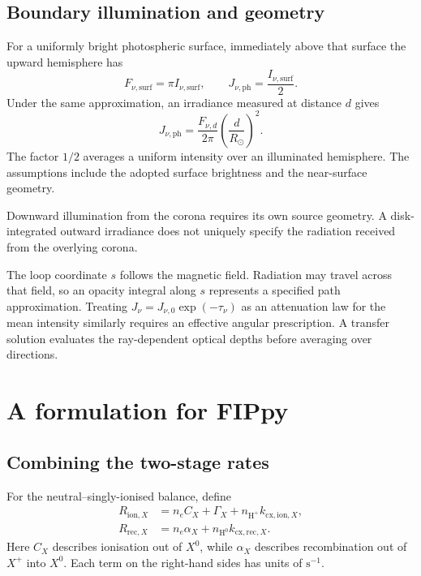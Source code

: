 \documentclass[a4paper,10pt,twoside,openany]{book}
\newcommand{\ChapColor}{Cap1Blue}
\newcommand{\ChapColorLight}{LightBlue}
\newcommand{\setChapColor}[2]{%
  \renewcommand{\ChapColor}{#1}%
  \renewcommand{\ChapColorLight}{#2}}
\numberwithin{equation}{chapter}
\begin{document}
\section{Boundary illumination and geometry}
For a uniformly bright photospheric surface, immediately above
that surface the upward hemisphere has
\begin{equation}
  F_{\nu,\mathrm{surf}}=\pi I_{\nu,\mathrm{surf}},
  \qquad J_{\nu,\mathrm{ph}}=\frac{I_{\nu,\mathrm{surf}}}{2}.
\end{equation}
Under the same approximation, an irradiance measured at distance
$d$ gives
\begin{equation}
  J_{\nu,\mathrm{ph}}
  =\frac{F_{\nu,d}}{2\pi}
   \left(\frac{d}{R_\odot}\right)^2.
\end{equation}
The factor $1/2$ averages a uniform intensity over an illuminated
hemisphere. The assumptions include the adopted surface brightness
and the near-surface geometry.

Downward illumination from the corona requires its own source
geometry. A disk-integrated outward irradiance does not uniquely
specify the radiation received from the overlying corona.

The loop coordinate $s$ follows the magnetic field. Radiation may
travel across that field, so an opacity integral along $s$ represents
a specified path approximation. Treating
$J_\nu=J_{\nu,0}\exp(-\tau_\nu)$ as an attenuation law for the mean
intensity similarly requires an effective angular prescription.
A transfer solution evaluates the ray-dependent optical depths
before averaging over directions.

\setChapColor{Cap4Purple}{LightPurple}
\chapter{A formulation for FIPpy}

\section{Combining the two-stage rates}
For the neutral--singly-ionised balance, define
\begin{align}
  R_{\mathrm{ion},X}
    &=n_eC_X+\Gamma_X
      +n_{\mathrm{H}^+}k_{\mathrm{cx,ion},X},
      \label{eq:total_ion}\\
  R_{\mathrm{rec},X}
    &=n_e\alpha_X
      +n_{\mathrm{H}^0}k_{\mathrm{cx,rec},X}.
      \label{eq:total_rec}
\end{align}
Here $C_X$ describes ionisation out of $X^0$, while $\alpha_X$
describes recombination out of $X^+$ into $X^0$. Each term on the
right-hand sides has units of $\mathrm{s^{-1}}$.
\end{document}
